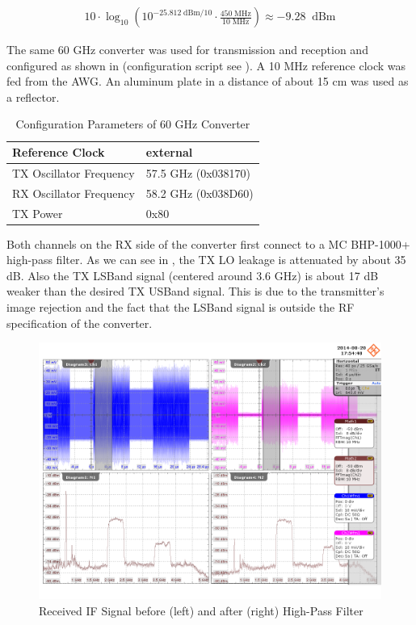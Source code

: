 \begin{align}
  10 \cdot \log_{10}\left(
  10^{-25.812 \;\text{dBm} / 10} \cdot
  \frac{450 \;\text{MHz}}{10 \;\text{MHz}}
  \right) \approx -9.28 \;\;\text{dBm}
  \label{eq:res_450_awg_pwr}
\end{align}

The same 60 GHz converter was used for transmission and reception and
configured as shown in  (configuration script
see ).
A 10 MHz reference clock was fed from the \gls{AWG}.
An aluminum plate in a distance of about 15 cm was used as a reflector. \\

\begin{table}[h]
  \centering
  \begin{tabular}{|l|l|}
    \hline
    Reference Clock & external \\ \hline
    TX Oscillator Frequency & 57.5 GHz (0x038170) \\ \hline
    RX Oscillator Frequency & 58.2 GHz (0x038D60) \\ \hline
    TX Power & 0x80 \\ \hline
  \end{tabular}
  \caption{Configuration Parameters of 60 GHz Converter}
  \label{tab:res_450_sivers}
\end{table}

Both channels on the \gls{RX} side of the converter first connect to a
\gls{MC} BHP-1000+ high-pass filter. As we can see in ,
the \gls{TX} \gls{LO} leakage is attenuated by about 35 dB. Also the \gls{TX}
\gls{LSBand} signal (centered around 3.6 GHz) is about 17 dB weaker than
the desired \gls{TX} \gls{USBand} signal. This is due to the transmitter's
image rejection and the fact that the \gls{LSBand} signal is outside the
\gls{RF} specification of the converter. \\

\begin{figure}[p]
  \centering
  \includegraphics[width=\textwidth]{figures/osci/res_450_rx_if}
  \caption{Received \gls{IF} Signal before (left) and after (right) High-Pass Filter}
  \label{fig:res_450_rx_if}
\end{figure}

